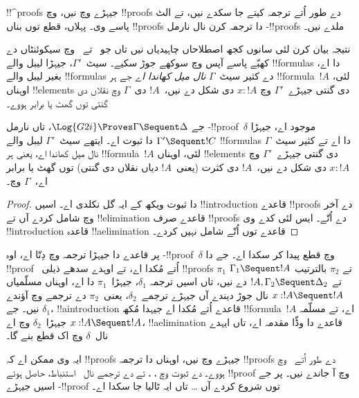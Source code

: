 \documentclass[../../../include/open-logic-section]{subfiles}
\begin{document}


!!^{proof}s جیہڑے  وچ نیں،  وچ !!{proof}s دے طور اُتے ترجمہ کیتے جا سکدے نیں، تے الٹ پاسے وی۔ پہلاں، قطع توں بناں  !!{proof}s دا ترجمہ کرن نال نارمل -!!{proof}s ملدے نیں۔

نتیجہ بیان کرن لئی سانوں کجھ اصطلاحاں چاہیدیاں نیں تاں جو~ تے~ وچ سیکوئنٹاں دے کھبّے پاسے آپس وچ سوکھے جوڑ سکیے۔ سیٹ~$\Gamma'$، جیہڑا لیبل والے !!{formula}s دا اے، بغیر لیبل والے !!{formula}s دے کثیر سیٹ~$\Gamma$ \emph{نال میل کھاندا اے} جے ہر !!{formula}~$!A$ لئی، اوہناں !!{element}s دی گنتی جیہڑے~$\Gamma'$ وچ $x : !A$ دی شکل دے نیں،~$!A$ دی~$\Gamma$ وچ نقلاں دی گنتی توں گھٹ یا برابر ہووے۔

\begin{cor}
جے $\Log{G2i} \Proves \Gamma \Sequent \Delta$، تاں نارمل -!!{proof}~$\delta$ موجود اے، جیہڑا $ \Gamma' \Sequent !C$ دا ثبوت اے۔ ایتھے سیٹ~$\Gamma'$ لیبل والے !!{formula}s دا اے تے کثیر سیٹ~$\Gamma$ نال میل کھاندا اے، یعنی ہر !!{formula}~$!A$ لئی، اوہناں !!{element}s دی گنتی جیہڑے~$\Gamma'$ وچ $x : !A$ دی شکل دے نیں،~$!A$ دی کثرت (یعنی~$!A$ دیاں نقلاں دی گنتی) توں گھٹ یا برابر اے،~$\Gamma$ وچ۔
\end{cor}

\begin{proof}
 دا ثبوت ویکھ کے ایہ گل نکلدی اے۔ اسیں !!{introduction} قاعدے !!{proof}s دے آخر وچ شامل کردے آں تے !!{elimination} قاعدے صرف !!{proof}s دے اُتّے۔ ایس لئی کدے وی !!{introduction} قاعدہ !!a{elimination} قاعدے توں اُتّے شامل نہیں کردے۔
\end{proof}

پر \Cut{} قاعدے دا جیہڑا ترجمہ  وچ دِتّا اے، اوہ -!!{proof}~$\delta$ وچ قطع پیدا کر سکدا اے۔ جے  دا !!{proof}~\Cut{} اُتے مُکدا اے، تے اوہدے سدھے ذیلی !!{proof}s $\pi_1$ تے $\pi_2$ بالترتیب $\Gamma_1
\Sequent !A$ تے $!A, \Gamma_2 \Sequent \Delta_2$ دے نیں، تاں اسیں ترجمہ $\delta_1$، جیہڑا~$\pi_1$ دا اے، اوہناں مسلّمیاں $x:!A
\Sequent !A$ نال جوڑ دیندے آں جیہڑے ترجمے~$\delta_2$، یعنی~$\pi_2$ دے ترجمے وچ آؤندے نیں۔ جے $\delta_1$، !!a{introduction} قاعدے اُتے مُکدا اے جیہدا مُکھ !!{formula}~$!A$ اے، تے مسلّمہ $x:!A \Sequent !A$ جیہڑا~$\delta_2$ وچ اے، !!a{elimination} قاعدے دا وڈّا مقدمہ اے، تاں ایہدے نال~$\delta$ وچ اک قطع بنے گا۔

ایہ وی ممکن اے کہ !!{proof}s جیہڑے  وچ نیں، اوہناں دا ترجمہ !!{proof}s دے طور اُتے~ وچ ہووے۔  دے ثبوت وچ \Elim{\land}، \Elim{\lif}، \Elim{\lnot} تے \Elim{\lforall} دے ترجمے نال~\Cut{} استنباط، حاصل ہوئے  !!{proof} وچ آ جاندے نیں۔ پر جے اسیں جیہڑے -!!{proof} توں شروع کردے آں … تاں ایہ ٹالیا جا سکدا اے۔
\end{document}
